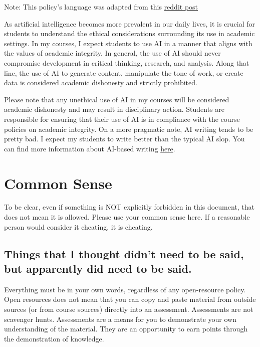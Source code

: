 \documentclass[
]{book}
\begin{document}
Note: This policy's language was adapted from this \href{https://www.reddit.com/r/Professors/comments/11mmz8k/the_ethical_use_of_artificial_intelligence/}{reddit post}

As artificial intelligence becomes more prevalent in our daily lives, it is crucial for students to understand the ethical considerations surrounding its use in academic settings. In my courses, I expect students to use AI in a manner that aligns with the values of academic integrity. In general, the use of AI should never compromise development in critical thinking, research, and analysis. Along that line, the use of AI to generate content, manipulate the tone of work, or create data is considered academic dishonesty and strictly prohibited.

Please note that any unethical use of AI in my courses will be considered academic dishonesty and may result in disciplinary action. Students are responsible for ensuring that their use of AI is in compliance with the course policies on academic integrity. On a more pragmatic note, AI writing tends to be pretty bad. I expect my students to write better than the typical AI slop. You can find more information about AI-based writing \href{https://en.wikipedia.org/wiki/Wikipedia:Signs_of_AI_writing}{here}.

\section{Common Sense}\label{common-sense}

To be clear, even if something is NOT explicitly forbidden in this document, that does not mean it is allowed. Please use your common sense here. If a reasonable person would consider it cheating, it is cheating.

\subsection{Things that I thought didn't need to be said, but apparently did need to be said.}\label{things-that-i-thought-didnt-need-to-be-said-but-apparently-did-need-to-be-said.}

Everything must be in your own words, regardless of any open-resource policy.
Open resources does not mean that you can copy and paste material from outside sources (or from course sources) directly into an assessment. Assessments are not scavenger hunts. Assessments are a means for you to demonstrate your own understanding of the material. They are an opportunity to earn points through the demonstration of knowledge.
\end{document}
